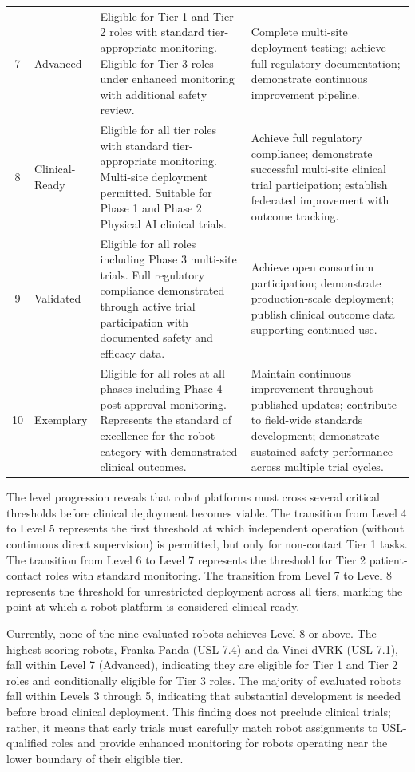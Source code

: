 \begin{longtable}{c l p{6cm} p{6cm}}
7 & Advanced & Eligible for Tier 1 and Tier 2 roles with standard tier-appropriate monitoring. Eligible for Tier 3 roles under enhanced monitoring with additional safety review. & Complete multi-site deployment testing; achieve full regulatory documentation; demonstrate continuous improvement pipeline. \\
8 & Clinical-Ready & Eligible for all tier roles with standard tier-appropriate monitoring. Multi-site deployment permitted. Suitable for Phase 1 and Phase 2 Physical AI clinical trials. & Achieve full regulatory compliance; demonstrate successful multi-site clinical trial participation; establish federated improvement with outcome tracking. \\
9 & Validated & Eligible for all roles including Phase 3 multi-site trials. Full regulatory compliance demonstrated through active trial participation with documented safety and efficacy data. & Achieve open consortium participation; demonstrate production-scale deployment; publish clinical outcome data supporting continued use. \\
10 & Exemplary & Eligible for all roles at all phases including Phase 4 post-approval monitoring. Represents the standard of excellence for the robot category with demonstrated clinical outcomes. & Maintain continuous improvement throughout published updates; contribute to field-wide standards development; demonstrate sustained safety performance across multiple trial cycles. \\
\end{longtable}

The level progression reveals that robot platforms must cross several critical
thresholds before clinical deployment becomes viable. The transition from Level
4 to Level 5 represents the first threshold at which independent operation
(without continuous direct supervision) is permitted, but only for non-contact
Tier 1 tasks. The transition from Level 6 to Level 7 represents the threshold
for Tier 2 patient-contact roles with standard monitoring. The transition from
Level 7 to Level 8 represents the threshold for unrestricted deployment across
all tiers, marking the point at which a robot platform is considered
clinical-ready.

Currently, none of the nine evaluated robots achieves Level 8 or above. The
highest-scoring robots, Franka Panda (USL 7.4) and da Vinci dVRK (USL 7.1),
fall within Level 7 (Advanced), indicating they are eligible for Tier 1 and
Tier 2 roles and conditionally eligible for Tier 3 roles. The majority of
evaluated robots fall within Levels 3 through 5, indicating that substantial
development is needed before broad clinical deployment. This finding does not
preclude clinical trials; rather, it means that early trials must carefully
match robot assignments to USL-qualified roles and provide enhanced monitoring
for robots operating near the lower boundary of their eligible tier.

